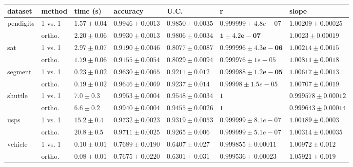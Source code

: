 \begin{tabular}{|ll|lllll|}
\hline
dataset   & method  & time (s) & accuracy & U.C. & r & slope \\\hline\hline
pendigits & 1 vs. 1 & $\mathbf{1.57\pm 0.04}$ &$\mathbf{0.9946\pm0.0013}$ &$\mathbf{0.9850\pm0.0035}$ & $    0.999999\pm  4.8e-07$ & $\mathbf{1.00209\pm  0.00025}$ \\
          & ortho.  & $      2.20\pm    0.06$ & $     0.9930\pm   0.0013$ & $     0.9806\pm   0.0034$ & $\mathbf{1\pm  4.2e-07}$ & $      1.0023\pm  0.00019$\\\hline
sat       & 1 vs. 1 & $       2.97\pm    0.07$ & $\mathbf{0.9190\pm0.0046}$ & $\mathbf{0.8077\pm0.0087}$ & $\mathbf{0.999996\pm4.3e-06}$ & $\mathbf{1.00214\pm   0.0015}$ \\
          & ortho.  & $\mathbf{1.79\pm 0.06}$ & $     0.9155\pm   0.0054$ & $    0.8029\pm   0.0094$ & $    0.999976\pm    1e-05$ & $     1.00811\pm   0.0018$\\\hline
segment   & 1 vs. 1 & $       0.23\pm    0.02$ & $    0.9630\pm   0.0065$ & $    0.9211\pm    0.012$ & $\mathbf{  0.999988\pm  1.2e-05}$ & $\mathbf{1.00617\pm0.0013}$ \\
          & ortho.  & $\mathbf{0.19\pm  0.02}$ & $\mathbf{0.9646\pm0.0069}$ & $\mathbf{0.9237\pm0.014}$ & $     0.99998\pm  1.5e-05$ & $     1.00707\pm   0.0019$\\\hline
shuttle   & 1 vs. 1 & $     7.0\pm   0.3$ & $\mathbf{0.9953\pm0.0004}$& $\mathbf{0.9548\pm  0.0034}$ & $           1$ & $    0.999578\pm  0.00012$ \\
          & ortho.  & $\mathbf{6.6\pm    0.2}$& $    0.9940\pm  0.0004$ & $    0.9455\pm   0.0026$ & $           1$ & $\mathbf{0.999643\pm  0.00014}$\\\hline
usps      & 1 vs. 1 & $\mathbf{15.2\pm   0.4}$ &$\mathbf{0.9732\pm0.0023}$ &$\mathbf{0.9319\pm0.0053}$ & $    0.999999\pm  8.1e-07$ & $\mathbf{1.00189\pm0.0003}$ \\
          & ortho.  & $      20.8\pm      0.5$ & $     0.9711\pm   0.0025$ & $     0.9265\pm    0.006$ & $    0.999999\pm  5.1e-07$ & $     1.00314\pm  0.00035$\\\hline
vehicle   & 1 vs. 1 & $      0.10\pm    0.01$ & $\mathbf{0.7689\pm0.0190}$ & $\mathbf{0.6407\pm    0.027}$ & $\mathbf{0.999855\pm0.00011}$ & $\mathbf{1.00972\pm    0.012}$ \\
          & ortho.  & $\mathbf{0.08\pm0.01}$ & $    0.7675\pm    0.0220$ & $    0.6301\pm    0.031$ & $    0.999536\pm  0.00023$ & $     1.05921\pm    0.019$\\\hline
\end{tabular}
